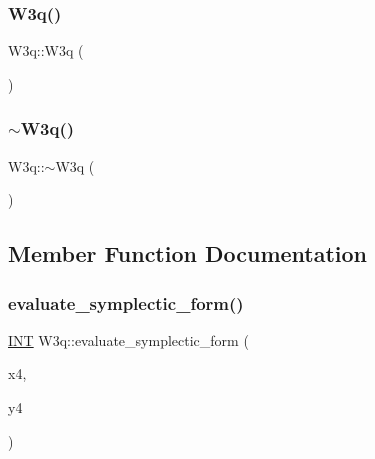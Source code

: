 \subsubsection{\texorpdfstring{W3q()}{W3q()}}
{\footnotesize\ttfamily W3q\+::\+W3q (\begin{DoxyParamCaption}{ }\end{DoxyParamCaption})}

\mbox{\label{class_w3q_a102f1c2912d727fe5251530c905afa38}} 
\subsubsection{\texorpdfstring{$\sim$\+W3q()}{~W3q()}}
{\footnotesize\ttfamily W3q\+::$\sim$\+W3q (\begin{DoxyParamCaption}{ }\end{DoxyParamCaption})}



\subsection{Member Function Documentation}
\mbox{\label{class_w3q_a73ac833e6a6177af4f4b870627ae48ee}} 
\subsubsection{\texorpdfstring{evaluate\+\_\+symplectic\+\_\+form()}{evaluate\_symplectic\_form()}}
{\footnotesize\ttfamily \mbox{\hyperlink{galois_8h_a09fddde158a3a20bd2dcadb609de11dc}{I\+NT}} W3q\+::evaluate\+\_\+symplectic\+\_\+form (\begin{DoxyParamCaption}\item[{\mbox{\hyperlink{galois_8h_a09fddde158a3a20bd2dcadb609de11dc}{I\+NT}} $\ast$}]{x4,  }\item[{\mbox{\hyperlink{galois_8h_a09fddde158a3a20bd2dcadb609de11dc}{I\+NT}} $\ast$}]{y4 }\end{DoxyParamCaption})}

\mbox{\label{class_w3q_a66437e3cf668d4de4a6661f444fd3d77}} 
